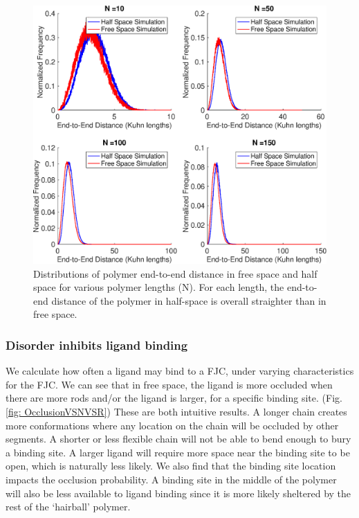 \documentclass[../../AdvancementSummary.tex]{subfiles}
\begin{document}
\begin{figure}[H]
	\begin{center}
		\includegraphics[width=0.8\linewidth]{ResultsFigures/General/ReeDistributionHalfVSFreeSim.eps}
		\caption{Distributions of polymer end-to-end distance in free space and half space for various polymer lengths (N). For each length, the end-to-end distance of the polymer in half-space is overall straighter than in free space.\label{fig: ReeHalfVSFree}}
	\end{center}
\end{figure}

\subsubsection{Disorder inhibits ligand binding}

We calculate how often a ligand may bind to a FJC, under varying characteristics for the FJC. We can see that in free space, the ligand is more occluded when there are more rods and/or the ligand is larger, for a specific binding site. (Fig. \ref{fig: OcclusionVSNVSR}) These are both intuitive results. A longer chain creates more conformations where any location on the chain will be occluded by other segments.  A shorter or less flexible chain will not be able to bend enough to bury a binding site.  A larger ligand will require more space near the binding site to be open, which is naturally less likely.
We also find that the binding site location impacts the occlusion probability. A binding site in the middle of the polymer will also be less available to ligand binding since it is more likely sheltered by the rest of the `hairball' polymer. 
\end{document}
